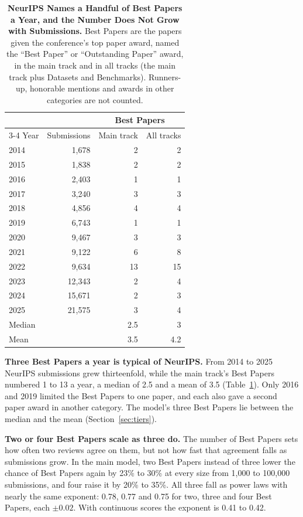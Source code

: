 \documentclass{article}
\begin{document}
\begin{table}[t]
\centering
\small
\caption{\textbf{NeurIPS Names a Handful of Best Papers a Year, and the Number Does Not Grow with Submissions.} Best Papers are the papers given the conference's top paper award, named the ``Best Paper'' or ``Outstanding Paper'' award, in the main track and in all tracks (the main track plus Datasets and Benchmarks). Runners-up, honorable mentions and awards in other categories are not counted.}
\label{tab:bestpapers}
\begin{tabular}{lrrr}
\toprule
 & & \multicolumn{2}{c}{Best Papers} \\
\cmidrule(lr){3-4}
Year & Submissions & Main track & All tracks \\
\midrule
2014 & 1,678 & 2 & 2 \\
2015 & 1,838 & 2 & 2 \\
2016 & 2,403 & 1 & 1 \\
2017 & 3,240 & 3 & 3 \\
2018 & 4,856 & 4 & 4 \\
2019 & 6,743 & 1 & 1 \\
2020 & 9,467 & 3 & 3 \\
2021 & 9,122 & 6 & 8 \\
2022 & 9,634 & 13 & 15 \\
2023 & 12,343 & 2 & 4 \\
2024 & 15,671 & 2 & 3 \\
2025 & 21,575 & 3 & 4 \\
\midrule
Median & & 2.5 & 3 \\
Mean & & 3.5 & 4.2 \\
\bottomrule
\end{tabular}
\end{table}

\textbf{Three Best Papers a year is typical of NeurIPS.} From 2014 to 2025 NeurIPS submissions grew thirteenfold, while the main track's Best Papers numbered 1 to 13 a year, a median of 2.5 and a mean of 3.5 (Table~\ref{tab:bestpapers}). Only 2016 and 2019 limited the Best Papers to one paper, and each also gave a second paper award in another category. The model's three Best Papers lie between the median and the mean (Section~\ref{sec:tiers}).

\textbf{Two or four Best Papers scale as three do.} The number of Best Papers sets how often two reviews agree on them, but not how fast that agreement falls as submissions grow. In the main model, two Best Papers instead of three lower the chance of Best Papers again by 23\% to 30\% at every size from 1,000 to 100,000 submissions, and four raise it by 20\% to 35\%. All three fall as power laws with nearly the same exponent: 0.78, 0.77 and 0.75 for two, three and four Best Papers, each $\pm0.02$. With continuous scores the exponent is 0.41 to 0.42.
\end{document}
